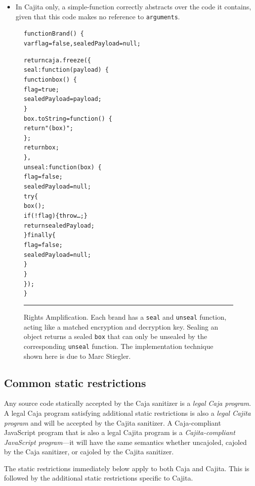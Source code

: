 \documentclass[letterpaper,twocolumn,10pt]{article}
\newcommand{\code}[1]{{\tt {#1}}}              %
\begin{document}
\begin{itemize}
  \item In Cajita only, a simple-function correctly abstracts over the code it contains, given that this code makes 
  no reference to \code{arguments}.
  
\end{itemize}



\begin{figure}[t!]
\begin{alltt}
function Brand()\ \{
  var flag = false, sealedPayload = null;

  return caja.freeze(\{
    seal: function(payload)\ \{
      function box()\ \{
        flag = true; 
        sealedPayload = payload;
      \}
      box.toString = function()\ \{
        return "(box)";
      \};
      return box;
    \},
    unseal: function(box)\ \{
      flag = false; 
      sealedPayload = null;
      try \{
        box();
        if (!flag) \{ throw {\ldots}; \}
        return sealedPayload;
      \} finally \{
        flag = false; 
        sealedPayload = null;
      \}
    \}
  \});
\}
\end{alltt}

\caption[Rights Amplification]{Rights Amplification. Each brand has a 
\code{seal} and \code{unseal} function, acting like a matched encryption and 
decryption key. Sealing an object returns a sealed \code{box} that can only 
be unsealed by the corresponding \code{unseal} function. The implementation 
technique shown here is due to Marc Stiegler.
\\ } \hrule
\label{fig:rights-amp}
\end{figure}



\subsection{Common static restrictions}
\label{subsec:common-static}

Any source code statically accepted by the Caja sanitizer is a \emph{legal 
Caja program}. A legal Caja program satisfying additional static restrictions 
is also a \emph{legal Cajita program} and will be accepted by the Cajita 
sanitizer. A Caja-compliant JavaScript program that is also a legal Cajita 
program is a \emph{Cajita-compliant JavaScript program}---it will have the 
same semantics whether uncajoled, cajoled by the Caja sanitizer, or cajoled 
by the Cajita sanitizer.

The static restrictions immediately below apply to both Caja and Cajita. This 
is followed by the additional static restrictions specific to Cajita.
\end{document}
